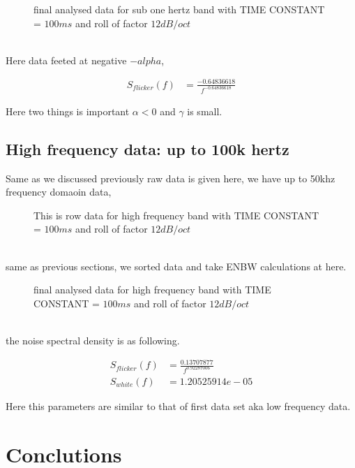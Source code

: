 \documentclass[draft,12pt]{article}
\begin{document}
\begin{figure}[hbt!]
\caption{final analysed data for sub one hertz band with TIME CONSTANT = $100ms$ and roll of factor $12dB/oct$}
\end{figure}\\


Here data feeted at negative $-alpha$,

\begin{align}\label{eq2}
S_{flicker}(f) & =  \frac{-0.64836618}{f^{-0.64836618}}
\end{align}

Here two things is important $\alpha < 0$ and $\gamma$ is small.

\subsection{High frequency data: up to 100k hertz}

Same as we discussed previously raw data is given here, we have up to 50khz frequency domaoin data,


\begin{figure}[hbt!]
\caption{This is row data for high frequency band with TIME CONSTANT = $100ms$ and roll of factor $12dB/oct$} 
\label{raw100k}
\end{figure}\\

same as previous sections, we sorted data and take ENBW calculations at here.

\begin{figure}[hbt!]
\caption{final analysed data for high frequency band with TIME CONSTANT = $100ms$ and roll of factor $12dB/oct$}
\end{figure}\\

the noise spectral density is as following.

\begin{align}\label{eq3}
S_{flicker}(f) & = \frac{0.13707877}{f^{0.92287006}}\\
S_{white}(f) & = 1.20525914e-05
\end{align}


Here this parameters are similar to that of first data set aka low frequency data.

\clearpage
\section{Conclutions}
\end{document}
